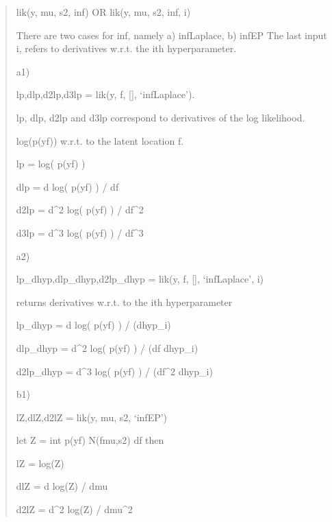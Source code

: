 \documentclass[letterpaper,10pt,english]{sphinxmanual}
\begin{document}
\begin{fulllineitems}
\begin{fulllineitems}
\begin{quote}
lik(y, mu, s2, inf) OR lik(y, mu, s2, inf, i)

There are two cases for inf, namely a) infLaplace, b) infEP 
The last input i, refers to derivatives w.r.t. the ith hyperparameter.

\begin{DUlineblock}{0em}
\item[] a1) 
\item[] lp,dlp,d2lp,d3lp = lik(y, f, {[}{]}, `infLaplace'). 
\item[] lp, dlp, d2lp and d3lp correspond to derivatives of the log likelihood. 
\item[] log(p(y\textbar{}f)) w.r.t. to the latent location f.
\item[] lp = log( p(y\textbar{}f) ) 
\item[] dlp = d log( p(y\textbar{}f) ) / df 
\item[] d2lp = d\textasciicircum{}2 log( p(y\textbar{}f) ) / df\textasciicircum{}2
\item[] d3lp = d\textasciicircum{}3 log( p(y\textbar{}f) ) / df\textasciicircum{}3 
\end{DUlineblock}

\begin{DUlineblock}{0em}
\item[] a2)
\item[] lp\_dhyp,dlp\_dhyp,d2lp\_dhyp = lik(y, f, {[}{]}, `infLaplace', i) 
\item[] returns derivatives w.r.t. to the ith hyperparameter 
\item[] lp\_dhyp = d log( p(y\textbar{}f) ) / (dhyp\_i) 
\item[] dlp\_dhyp = d\textasciicircum{}2 log( p(y\textbar{}f) ) / (df   dhyp\_i) 
\item[] d2lp\_dhyp = d\textasciicircum{}3 log( p(y\textbar{}f) ) / (df\textasciicircum{}2 dhyp\_i) 
\end{DUlineblock}

\begin{DUlineblock}{0em}
\item[] b1)
\item[] lZ,dlZ,d2lZ = lik(y, mu, s2, `infEP') 
\item[] let Z = int p(y\textbar{}f) N(f\textbar{}mu,s2) df then 
\item[] lZ = log(Z) 
\item[] dlZ = d log(Z) / dmu 
\item[] d2lZ = d\textasciicircum{}2 log(Z) / dmu\textasciicircum{}2 
\end{DUlineblock}


\end{quote}
\end{fulllineitems}
\end{fulllineitems}
\end{document}
